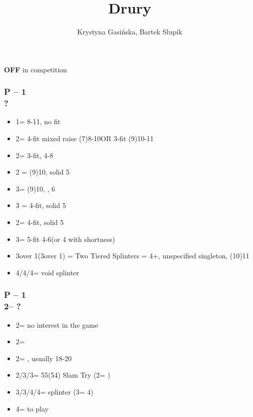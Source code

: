 \documentclass[12pt, a4paper]{article}
\title{Drury}
\author{Krystyna Gasińska, Bartek Słupik}
\begin{document}
\maketitle


{\textbf{OFF}} in competition

\subsubsection*{P -- 1\major \\ ?}
\begin{itemize}
    \item 1\nt = 8-11, no fit
    \item 2\clubs = 4-fit mixed raise (7)8-10\dps OR 3-fit (9)10-11\dps
    \item 2\major = 3-fit, 4-8\dps
    \item 2 = (9)10, solid 5
    \item 3\clubs = (9)10, \inv, 6\clubs
    \item 3 = 4-fit, solid 5
    \item 2\nt = 4-fit, solid 5\clubs
    \item 3\major = 5-fit 4-6\dps (or 4 with shortness)
    \item 3\nt over 1\spades (3\spades over 1\hearts) = Two Tiered Splinters = 4+\major, unspecified singleton, (10)11\dps
    \item 4\clubs/4\diams/4\hearts = void splinter
\end{itemize}

\subsubsection*{P -- 1\hearts \\ 2\clubs -- ?}
\begin{itemize}
    \item 2\hearts = no interest in the game
    \item 2\diams = \inv
    \item 2\spades = \lsf, usually 18-20 \bal
    \item 2\nt/3\clubs/3\diams = 55(54) Slam Try (2\nt = \spades)
    \item 3\nt/3\spades/4\clubs/4\diams = splinter (3\nt = 4\diams)
    \item 4\hearts = to play
\end{itemize}
\end{document}
